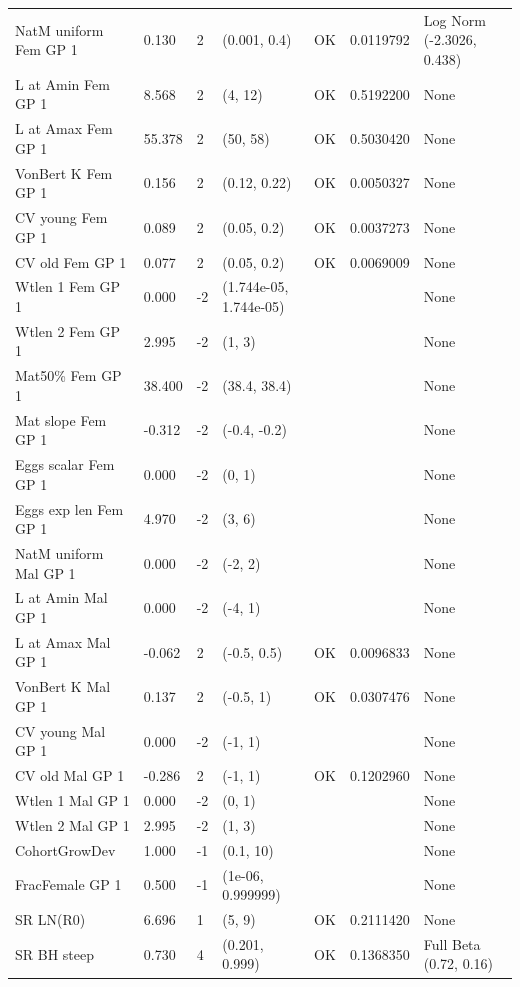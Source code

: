 \documentclass[11pt,
  english,
]{article}
\begin{document}
\begin{landscape}
\begin{longtable}[t]{lllllll}
\endfoot
\bottomrule
\endlastfoot
NatM uniform Fem GP 1 & 0.130 & 2 & (0.001, 0.4) & OK & 0.0119792 & Log Norm (-2.3026, 0.438)\\
L at Amin Fem GP 1 & 8.568 & 2 & (4, 12) & OK & 0.5192200 & None\\
L at Amax Fem GP 1 & 55.378 & 2 & (50, 58) & OK & 0.5030420 & None\\
VonBert K Fem GP 1 & 0.156 & 2 & (0.12, 0.22) & OK & 0.0050327 & None\\
CV young Fem GP 1 & 0.089 & 2 & (0.05, 0.2) & OK & 0.0037273 & None\\
\addlinespace
CV old Fem GP 1 & 0.077 & 2 & (0.05, 0.2) & OK & 0.0069009 & None\\
Wtlen 1 Fem GP 1 & 0.000 & -2 & (1.744e-05, 1.744e-05) &  &  & None\\
Wtlen 2 Fem GP 1 & 2.995 & -2 & (1, 3) &  &  & None\\
Mat50\% Fem GP 1 & 38.400 & -2 & (38.4, 38.4) &  &  & None\\
Mat slope Fem GP 1 & -0.312 & -2 & (-0.4, -0.2) &  &  & None\\
\addlinespace
Eggs scalar Fem GP 1 & 0.000 & -2 & (0, 1) &  &  & None\\
Eggs exp len Fem GP 1 & 4.970 & -2 & (3, 6) &  &  & None\\
NatM uniform Mal GP 1 & 0.000 & -2 & (-2, 2) &  &  & None\\
L at Amin Mal GP 1 & 0.000 & -2 & (-4, 1) &  &  & None\\
L at Amax Mal GP 1 & -0.062 & 2 & (-0.5, 0.5) & OK & 0.0096833 & None\\
\addlinespace
VonBert K Mal GP 1 & 0.137 & 2 & (-0.5, 1) & OK & 0.0307476 & None\\
CV young Mal GP 1 & 0.000 & -2 & (-1, 1) &  &  & None\\
CV old Mal GP 1 & -0.286 & 2 & (-1, 1) & OK & 0.1202960 & None\\
Wtlen 1 Mal GP 1 & 0.000 & -2 & (0, 1) &  &  & None\\
Wtlen 2 Mal GP 1 & 2.995 & -2 & (1, 3) &  &  & None\\
\addlinespace
CohortGrowDev & 1.000 & -1 & (0.1, 10) &  &  & None\\
FracFemale GP 1 & 0.500 & -1 & (1e-06, 0.999999) &  &  & None\\
SR LN(R0) & 6.696 & 1 & (5, 9) & OK & 0.2111420 & None\\
SR BH steep & 0.730 & 4 & (0.201, 0.999) & OK & 0.1368350 & Full Beta (0.72, 0.16)\\

\end{longtable}
\end{landscape}
\end{document}

